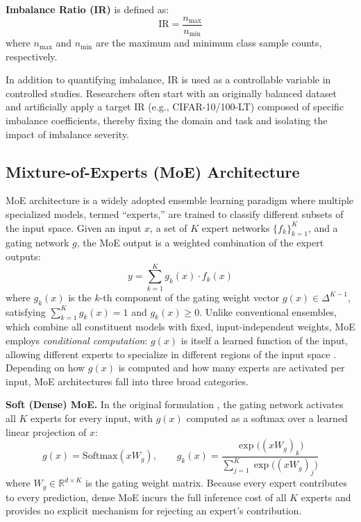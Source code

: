 \documentclass[sigconf]{acmart}
\begin{document}
\textbf{Imbalance Ratio (IR)} \citep{Zhong_2021_CVPR} is defined as:
\begin{equation}
\text{IR} = \frac{n_{\max}}{n_{\min}}
\end{equation}
where $n_{\max}$ and $n_{\min}$ are the maximum and minimum class sample counts, respectively.

In addition to quantifying imbalance, IR is used as a controllable variable in controlled studies. Researchers often start with an originally balanced dataset and artificially apply a target IR (e.g., CIFAR-10/100-LT) composed of specific imbalance coefficients, thereby fixing the domain and task and isolating the impact of imbalance severity. 



\subsection{Mixture-of-Experts (MoE) Architecture}
MoE architecture is a widely adopted ensemble learning paradigm where multiple specialized models, termed ``experts,'' are trained to classify different subsets of the input space. Given an input $x$, a set of $K$ expert networks $\{f_k\}_{k=1}^{K}$, and a gating network $g$, the MoE output is a weighted combination of the expert outputs:
\begin{equation}
y = \sum_{k=1}^{K} g_k(x) \cdot f_k(x)
\end{equation}
where $g_k(x)$ is the $k$-th component of the gating weight vector $g(x) \in \Delta^{K-1}$, satisfying $\sum_{k=1}^{K} g_k(x) = 1$ and $g_k(x) \geq 0$. Unlike conventional ensembles, which combine all constituent models with fixed, input-independent weights, MoE employs \textit{conditional computation}: $g(x)$ is itself a learned function of the input, allowing different experts to specialize in different regions of the input space \citep{jordan1994hierarchical}. Depending on how $g(x)$ is computed and how many experts are activated per input, MoE architectures fall into three broad categories.

\textbf{Soft (Dense) MoE.} In the original formulation \citep{jacobs1991adaptive, jordan1994hierarchical}, the gating network activates all $K$ experts for every input, with $g(x)$ computed as a softmax over a learned linear projection of $x$:
\begin{equation}
g(x) = \mathrm{Softmax}(xW_g), \qquad g_k(x) = \frac{\exp\big((xW_g)_k\big)}{\sum_{j=1}^{K}\exp\big((xW_g)_j\big)}
\end{equation}
where $W_g \in \mathbb{R}^{d \times K}$ is the gating weight matrix. Because every expert contributes to every prediction, dense MoE incurs the full inference cost of all $K$ experts and provides no explicit mechanism for rejecting an expert's contribution.
\end{document}
